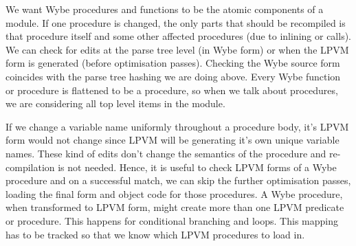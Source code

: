 We want Wybe procedures and functions to be the atomic components of a
module. If one procedure is changed, the only parts that should be recompiled
is that procedure itself and some other affected procedures (due to inlining or
calls). We can check for edits at the parse tree level (in Wybe form) or when
the LPVM form is generated (before optimisation passes). Checking the Wybe
source form coincides with the parse tree hashing we are doing above. Every
Wybe function or procedure is flattened to be a procedure, so when we talk
about procedures, we are considering all top level items in the module. 

If we change a variable name uniformly throughout a procedure body, it's LPVM
form would not change since LPVM will be generating it's own unique variable
names. These kind of edits don't change the semantics of the procedure and
re-compilation is not needed. Hence, it is useful to check LPVM forms of a Wybe
procedure and on a successful match, we can skip the further optimisation
passes, loading the final form and object code for those procedures. A Wybe
procedure, when transformed to LPVM form, might create more than one LPVM
predicate or procedure. This happens for conditional branching and loops. This
mapping has to be tracked so that we know which LPVM procedures to load in.




